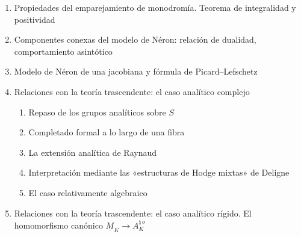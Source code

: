 \begin{enumerate}[label=\arabic*.]
\item Propiedades del emparejamiento de monodromía. Teorema de
  integralidad y positividad
\item Componentes conexas del modelo de Néron: relación de dualidad,
  comportamiento asintótico
\item Modelo de Néron de una jacobiana y fórmula de Picard--Lefschetz
\item Relaciones con la teoría trascendente: el caso analítico complejo
  \begin{enumerate}[label=\arabic{enumi}.\arabic*.]
  \item Repaso de los grupos analíticos sobre $S$
  \item Completado formal a lo largo de una fibra
  \item La extensión analítica de Raynaud
  \item Interpretación mediante las «estructuras de Hodge mixtas» de
    Deligne
  \item El caso relativamente algebraico
  \end{enumerate}
\item Relaciones con la teoría trascendente: el caso analítico rígido.
  El homomorfismo canónico
  $\underline M_K\longrightarrow A_K^{\natural\,o}$
\end{enumerate}

